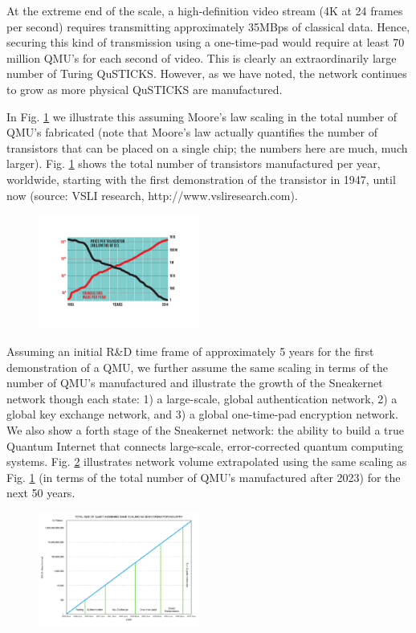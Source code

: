 \documentclass[twocolumn, aps, rmp, amsmath, amssymb, nofootinbib, superscriptaddress, longbibliography, floatfix, table-of-contents, eqsecnum]{revtex4-2}
\begin{document}
At the extreme end of the scale, a high-definition video stream (4K at 24 frames per second) requires transmitting approximately 35MBps of classical data. Hence, securing this kind of transmission using a one-time-pad would require at least 70 million QMU's for each second of video. This is clearly an extraordinarily large number of Turing QuSTICKS. However, as we have noted, the network continues to grow as more physical QuSTICKS are manufactured. 

In Fig. \ref{fig:transistor} we illustrate this assuming Moore's law scaling in the total number of QMU's fabricated (note that Moore's law actually quantifies the number of transistors that can be placed on a single chip; the numbers here are much, much larger). Fig. \ref{fig:transistor} shows the total number of transistors manufactured per year, worldwide, starting with the first demonstration of the transistor in 1947, until now (source: VSLI research, http://www.vsliresearch.com). 

\begin{figure}[htbp!]
	\includegraphics[clip=true, width=0.475\textwidth]{transistor}
	\caption{}
	\label{fig:transistor}
\end{figure}

Assuming an initial R\&D time frame of approximately 5 years for the first demonstration of a QMU, we further assume the same scaling in terms of the number of QMU's manufactured and illustrate the growth of the Sneakernet network though each state: 1) a large-scale, global authentication network, 2) a global key exchange network, and 3) a global one-time-pad encryption network. We also show a forth stage of the Sneakernet network: the ability to build a true Quantum Internet that connects large-scale, error-corrected quantum computing systems. Fig. \ref{fig:QMU} illustrates network volume extrapolated using the same scaling as Fig. \ref{fig:transistor} (in terms of the total number of QMU's manufactured after 2023) for the next 50 years. 

\begin{figure}[htbp!]
	\includegraphics[clip=true, width=0.475\textwidth]{QMU}
	\caption{}
	\label{fig:QMU}
\end{figure}
\end{document}

